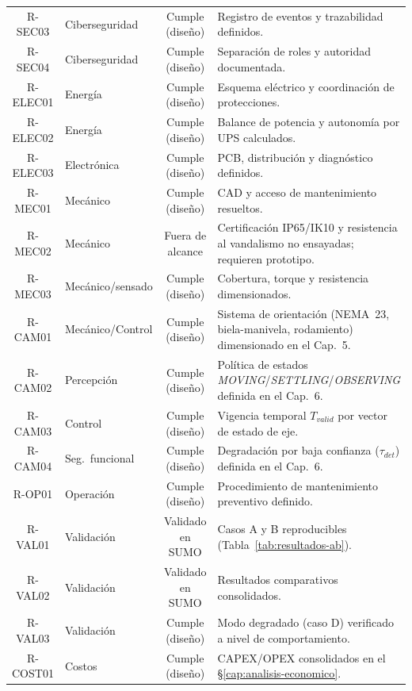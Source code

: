 \begin{landscape}
\begin{longtable}{@{}c p{4.2cm} c p{9.5cm}@{}}
R-SEC03 & Ciberseguridad     & Cumple (diseño)    & Registro de eventos y trazabilidad definidos.\\
R-SEC04 & Ciberseguridad     & Cumple (diseño)    & Separación de roles y autoridad documentada.\\
R-ELEC01 & Energía           & Cumple (diseño)    & Esquema eléctrico y coordinación de protecciones.\\
R-ELEC02 & Energía           & Cumple (diseño)    & Balance de potencia y autonomía por UPS calculados.\\
R-ELEC03 & Electrónica       & Cumple (diseño)    & PCB, distribución y diagnóstico definidos.\\
R-MEC01 & Mecánico           & Cumple (diseño)    & CAD y acceso de mantenimiento resueltos.\\
R-MEC02 & Mecánico           & Fuera de alcance   & Certificación IP65/IK10 y resistencia al vandalismo no ensayadas; requieren prototipo.\\
R-MEC03 & Mecánico/sensado   & Cumple (diseño)    & Cobertura, torque y resistencia dimensionados.\\
R-CAM01 & Mecánico/Control   & Cumple (diseño)    & Sistema de orientación (NEMA~23, biela-manivela, rodamiento) dimensionado en el Cap.~5.\\
R-CAM02 & Percepción         & Cumple (diseño)    & Política de estados \textit{MOVING}/\textit{SETTLING}/\textit{OBSERVING} definida en el Cap.~6.\\
R-CAM03 & Control            & Cumple (diseño)    & Vigencia temporal $T_{valid}$ por vector de estado de eje.\\
R-CAM04 & Seg.\ funcional    & Cumple (diseño)    & Degradación por baja confianza ($\tau_{det}$) definida en el Cap.~6.\\
R-OP01  & Operación          & Cumple (diseño)    & Procedimiento de mantenimiento preventivo definido.\\
R-VAL01 & Validación         & Validado en SUMO   & Casos A y B reproducibles (Tabla~\ref{tab:resultados-ab}).\\
R-VAL02 & Validación         & Validado en SUMO   & Resultados comparativos consolidados.\\
R-VAL03 & Validación         & Cumple (diseño)    & Modo degradado (caso D) verificado a nivel de comportamiento.\\
R-COST01 & Costos            & Cumple (diseño)    & CAPEX/OPEX consolidados en el §\ref{cap:analisis-economico}.\\
\end{longtable}
\end{landscape}

